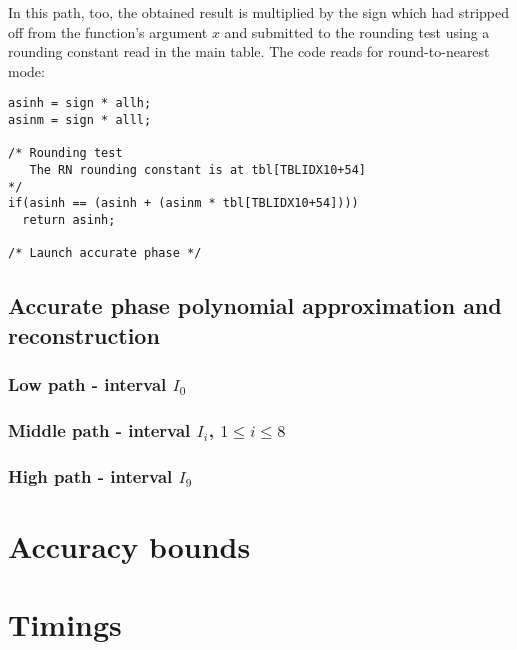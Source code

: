 In this path, too, the obtained result is multiplied by the sign which
had stripped off from the function's argument $x$ and submitted to the
rounding test using a rounding constant read in the main table. The
code reads for round-to-nearest mode:
\begin{lstlisting}[caption={Multiplication of the function's sign, rounding test (round-to-nearest)},firstnumber=1]
asinh = sign * allh;
asinm = sign * alll;

/* Rounding test 
   The RN rounding constant is at tbl[TBLIDX10+54]
*/
if(asinh == (asinh + (asinm * tbl[TBLIDX10+54]))) 
  return asinh;

/* Launch accurate phase */
\end{lstlisting} 
\subsection{Accurate phase polynomial approximation and reconstruction}\label{subsec:asinaccupolynomial}

\subsubsection{Low path - interval $I_0$\label{sec:asinacculowpath}}

\subsubsection{Middle path - interval $I_i$, $1 \leq i \leq 8$}

\subsubsection{High path - interval $I_9$}

\section{Accuracy bounds}\label{sec:asinaccuracy}

\section{Timings}\label{sec:asintiming}

